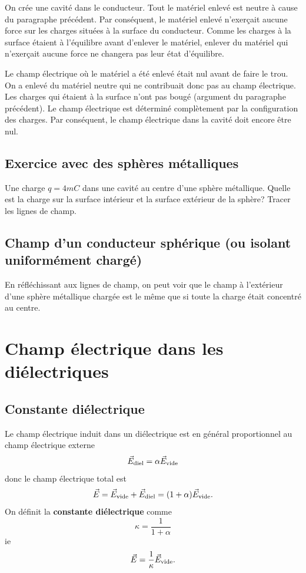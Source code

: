 On crée une cavité dans le conducteur. Tout le matériel enlevé est
neutre à cause du paragraphe précédent. Par conséquent, le matériel enlevé
n'exerçait aucune force sur les charges situées à la surface du conducteur.
Comme les charges à la surface étaient à l'équilibre avant d'enlever le
matériel, enlever du matériel qui n'exerçait aucune force ne changera pas leur
état d'équilibre.

Le champ électrique où le matériel a été enlevé était nul avant de faire le
trou. On a enlevé du matériel neutre qui ne contribuait donc pas au champ
électrique. Les charges qui étaient à la surface n'ont pas bougé (argument du
paragraphe précédent). Le champ électrique est déterminé complètement par la
configuration des charges. Par conséquent, le champ électrique dans la cavité
doit encore être nul.


\subsection*{Exercice avec des sphères métalliques}

Une charge $q = \si{4}{mC}$ dans une cavité au centre d'une sphère métallique.
Quelle est la charge sur la surface intérieur et la surface extérieur de la
sphère? Tracer les lignes de champ.


\subsection*{Champ d'un conducteur sphérique (ou isolant uniformément chargé)}

En réfléchissant aux lignes de champ, on peut voir que le champ à l'extérieur
d'une sphère métallique chargée est le même que si toute la charge était
concentré au centre.


\section{Champ électrique dans les diélectriques}


\subsection*{Constante diélectrique}


Le champ électrique induit dans un diélectrique est en général proportionnel au
champ électrique externe
$$\vec{E}_\text{diel} = \alpha \vec{E}_\text{vide}$$
donc le champ électrique total est
$$\vec{E} = \vec{E}_\text{vide} + \vec{E}_\text{diel} = (1 + \alpha) \vec{E}_\text{vide}.$$
On définit la \textbf{constante diélectrique} comme
$$\kappa = \frac{1}{1 + \alpha}$$
ie
$$\vec{E} = \frac{1}{\kappa} \vec{E}_\text{vide}.$$


